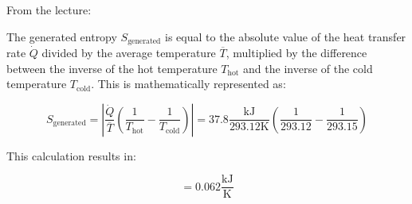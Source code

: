 From the lecture:

The generated entropy \( S_{\text{generated}} \) is equal to the absolute value of the heat transfer rate \( \dot{Q} \) divided by the average temperature \( \overline{T} \), multiplied by the difference between the inverse of the hot temperature \( T_{\text{hot}} \) and the inverse of the cold temperature \( T_{\text{cold}} \). This is mathematically represented as:

\[
S_{\text{generated}} = \left| \frac{\dot{Q}}{\overline{T}} \left( \frac{1}{T_{\text{hot}}} - \frac{1}{T_{\text{cold}}} \right) \right| = 37.8 \frac{\text{kJ}}{293.12 \text{K}} \left( \frac{1}{293.12} - \frac{1}{293.15} \right)
\]

This calculation results in:

\[
= 0.062 \frac{\text{kJ}}{\text{K}}
\]